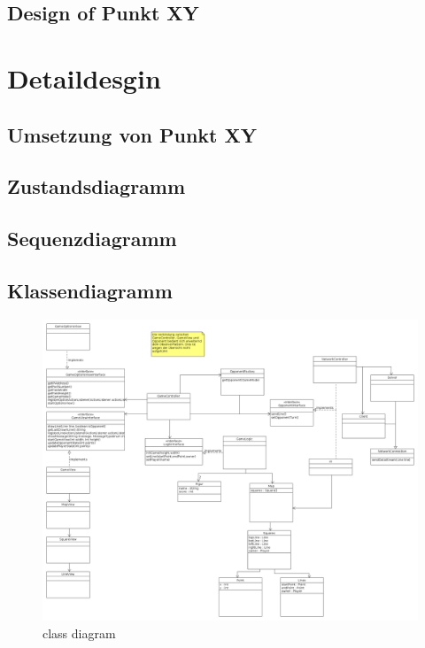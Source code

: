 \documentclass[a4paper, 10pt, fleqn]{article}
\begin{document}
		\subsection{Design of Punkt XY}
		
	\clearpage
	\section{Detaildesgin}
		\subsection{Umsetzung von Punkt XY}
		\subsection{Zustandsdiagramm}
		
		\subsection{Sequenzdiagramm}	
		
		\subsection{Klassendiagramm}
			\begin{figure}[H]
				\centering
				\includegraphics[width=.8\textwidth]{classdiagram.png}
				\caption{class diagram}
			\end{figure}
\end{document}
